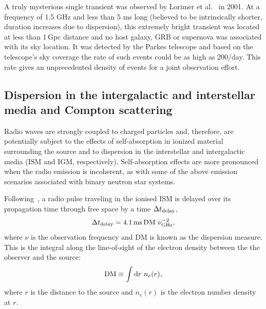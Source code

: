 \documentclass[epsf]{article}
\begin{document}
A truly mysterious single transient was observed by Lorimer et al.\
\cite{lorimer} in 2001. At a frequency of 1.5
GHz and less than 5 ms long (believed to be intrinsically shorter,
duration increases due to dispersion), this extremely bright
transient was located at less than 1\,Gpc distance and no host galaxy,
GRB or supernova was associated with its sky location.  It was
detected by the Parkes telescope and based on the telescope's sky
coverage the rate of such events could be as high as 200/day. This
rate gives an unprecedented density of events for a joint
observation effort.

\subsection{Dispersion in the intergalactic and interstellar media and Compton scattering}
Radio waves are strongly coupled to charged
particles and, therefore, are potentially subject to the effects of 
self-absorption in ionized material surrounding the source and to dispersion 
in the interstellar and intergalactic media (ISM and IGM, respectively). 
Self-absorption effects are more pronounced when the radio emission 
is incoherent, as with some of the above emission scenarios associated with
binary neutron star systems.

Following~\cite{pulsar_book}, a radio pulse traveling
in the ionised ISM is delayed over its propagation time through 
free space by a time $\Delta t_{\rm delay}$,
\begin{equation}
\Delta t_{\rm delay} = 4.1\,{\rm ms}\,{\rm DM}~\nu^{-2}_{\rm GHz},
\end{equation}
where $\nu$ is the observation frequency and DM is known as the dispersion measure.
This is the integral along the 
line-of-sight of the electron density between the the observer and the source:
\begin{equation}
{\rm DM} \equiv \int {\rm d}r~n_e(r),
\end{equation}
where $r$ is the distance to the source and $n_e(r)$ is the electron number
density at $r$.
\end{document}
